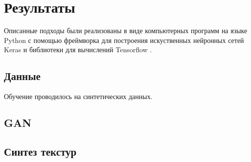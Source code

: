 \section{Результаты}
	Описанные подходы были реализованы в виде компьютерных программ на языке Python с помощью фреймворка для построения искуственных нейронных сетей Keras \cite{keras} и библиотеки для вычислений Tensorflow \cite{tf}.
	\subsection{Данные}
		Обучение проводилось на синтетических данных. 
	\subsection{GAN}
	\subsection{Синтез текстур}